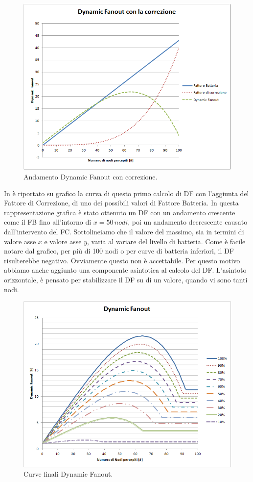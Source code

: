\begin{figure}[t]
	\centering
	\includegraphics[width=0.9\linewidth]{Images/grafici_usati/DF_andamento_teorico}
	\caption[Andamento teorico DF]{Andamento Dynamic Fanout con correzione.}
	\label{fig:DF_andamento_teorico}
\end{figure}
In  è riportato su grafico la curva di questo primo calcolo di \acs{DF} con l'aggiunta del Fattore di Correzione, di uno dei possibili valori di Fattore Batteria. In questa rappresentazione grafica è stato ottenuto un \acs{DF} con un andamento crescente come il FB fino all'intorno di $\textit{x}=50\,nodi$, poi un andamento decrescente causato dall'intervento del FC. Sottolineiamo che il valore del massimo, sia in termini di valore asse $ x $ e valore asse $ y $, varia al variare del livello di batteria. Come è facile notare dal grafico, per più di 100 nodi o per curve di batteria inferiori, il \acs{DF} risulterebbe negativo. Ovviamente questo non è accettabile. Per questo motivo abbiamo anche aggiunto una componente asintotica al calcolo del \acs{DF}. L'asintoto orizzontale, è pensato per stabilizzare il \acs{DF} su di un valore, quando vi sono tanti nodi.
\begin{figure}[t]
	\centering
	\includegraphics[width=0.9\linewidth]{Images/grafici_usati/DF_tot_no_arr}
	\caption[DF finale (continuo)]{Curve finali Dynamic Fanout.}
	\label{fig:DF_tot_no_arr}
\end{figure}
